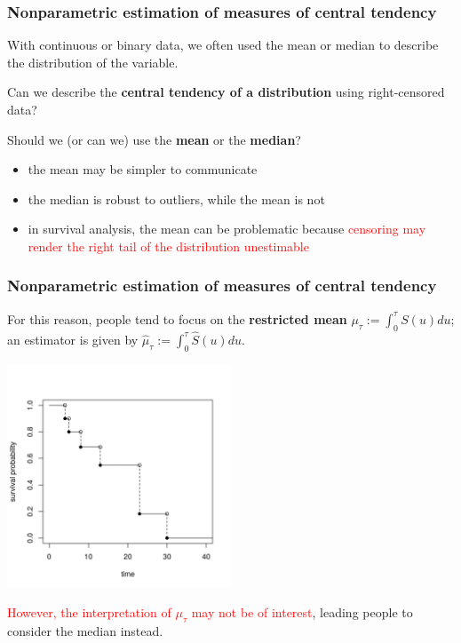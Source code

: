 \documentclass[12pt, 
hyperref={colorlinks=true, linkcolor=blue, urlcolor=cyan},dvipsnames]{beamer}
\begin{document}
\begin{frame}
\frametitle{Nonparametric estimation of measures of central tendency}

With continuous or binary data, we often used the mean or median to describe the distribution of the variable.

Can we describe the \textbf{central tendency of a distribution} using right-censored data?

Should we (or can we) use the \textbf{mean} or the \textbf{median}?
\begin{itemize}
\item the mean may be simpler to communicate
\item the median is robust to outliers, while the mean is not
\item in survival analysis, the mean can be problematic because \textcolor{red}{censoring may render the right tail of the distribution unestimable}
\end{itemize}
\end{frame}

\begin{frame}
\frametitle{Nonparametric estimation of measures of central tendency}

For this reason, people tend to focus on the \textbf{restricted mean} $\mu_\tau := \int_0^\tau S(u) du$; an estimator is given by $\widehat{\mu}_\tau := \int_0^\tau \widehat{S}(u)du$.\vspace{-0.6cm}

\begin{center}
\includegraphics[width=0.5\textwidth]{figs/km_small_example.png}
\end{center}\vspace{-0.6cm}

\textcolor{red}{However, the interpretation of $\mu_\tau$ may not be of interest}, leading people to consider the median instead.
\end{frame}
\end{document}
